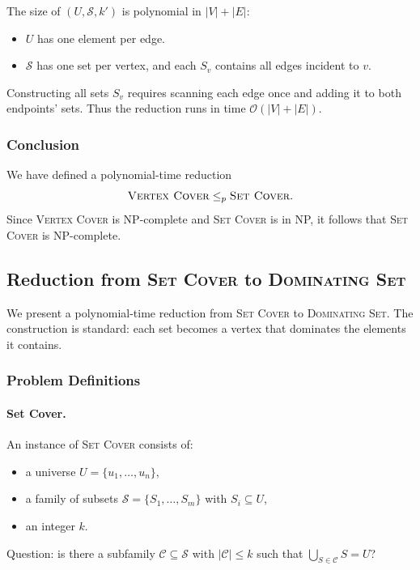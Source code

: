 \documentclass[9pt]{extarticle}
\begin{document}
The size of $(U,\mathcal{S},k')$ is polynomial in $|V| + |E|$:
\begin{itemize}
    \item $U$ has one element per edge.
    \item $\mathcal{S}$ has one set per vertex, and each $S_v$ contains all
          edges incident to $v$.
\end{itemize}
Constructing all sets $S_v$ requires scanning each edge once and adding it to
both endpoints’ sets.  Thus the reduction runs in time $\mathcal{O}(|V| + |E|)$.

\subsubsection*{Conclusion}

We have defined a polynomial-time reduction
\[
    \textsc{Vertex Cover} \le_p \textsc{Set Cover}.
\]
Since \textsc{Vertex Cover} is NP-complete and \textsc{Set Cover} is in NP, it
follows that \textsc{Set Cover} is NP-complete.
\subsection{Reduction from \textsc{Set Cover} to \textsc{Dominating Set}}

We present a polynomial-time reduction from \textsc{Set Cover} to
\textsc{Dominating Set}.  The construction is standard: each set becomes a
vertex that dominates the elements it contains.

\subsubsection*{Problem Definitions}

\paragraph{Set Cover.}
An instance of \textsc{Set Cover} consists of:
\begin{itemize}
    \item a universe $U = \{u_1,\dots,u_n\}$,
    \item a family of subsets $\mathcal{S} = \{S_1,\dots,S_m\}$ with
          $S_i \subseteq U$,
    \item an integer $k$.
\end{itemize}
Question: is there a subfamily $\mathcal{C} \subseteq \mathcal{S}$ with
$|\mathcal{C}| \le k$ such that $\bigcup_{S \in \mathcal{C}} S = U$?
\end{document}
